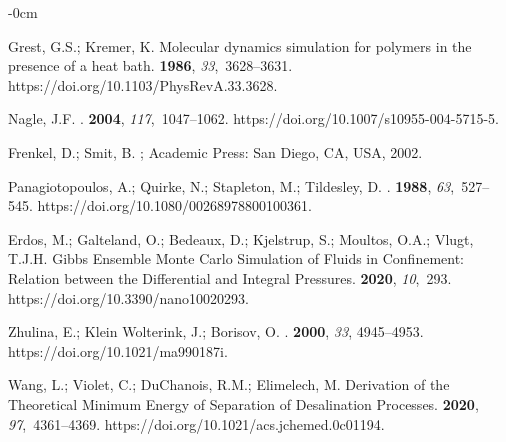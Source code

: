 \documentclass[gels,article,accept,pdftex,moreauthors]{Definitions/mdpi}
\begin{document}
\begin{adjustwidth}{-\extralength}{0cm}
\begin{thebibliography}{999}
Grest, G.S.; Kremer, K.
\newblock Molecular dynamics simulation for polymers in the presence of a heat
  bath.
 {\bf 1986}, {\em 33},~3628--3631.
\newblock
  https://doi.org/10.1103/PhysRevA.33.3628.%

Nagle, J.F.
.
 {\bf 2004}, {\em
  117},~1047--1062.
\newblock
  https://doi.org/10.1007/s10955-004-5715-5.%

Frenkel, D.; Smit, B.
; Academic Press:  San  Diego, CA, USA,  2002.

Panagiotopoulos, A.; Quirke, N.; Stapleton, M.; Tildesley, D.
.
 {\bf 1988}, {\em 63},~527--545.
\newblock
  https://doi.org/10.1080/00268978800100361.%

Erdos, M.; Galteland, O.; Bedeaux, D.; Kjelstrup, S.; Moultos, O.A.; Vlugt,
  T.J.H.
\newblock Gibbs Ensemble Monte Carlo Simulation of Fluids in Confinement:
  Relation between the Differential and Integral Pressures.
 {\bf 2020}, {\em 10},~293.
\newblock
  https://doi.org/10.3390/nano10020293.%

Zhulina, E.; {Klein Wolterink}, J.; Borisov, O.
.
 {\bf 2000}, {\em
  33}, 4945--4953.
\newblock
  https://doi.org/10.1021/ma990187i.%

Wang, L.; Violet, C.; DuChanois, R.M.; Elimelech, M.
\newblock Derivation of the Theoretical Minimum Energy of Separation of
  Desalination Processes.
 {\bf 2020}, {\em 97},~4361--4369.
\newblock
  https://doi.org/10.1021/acs.jchemed.0c01194.%


\end{thebibliography}
\end{adjustwidth}
\end{document}
